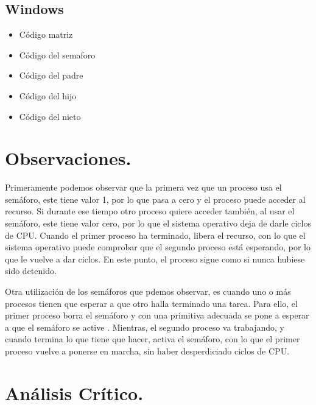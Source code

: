 \documentclass[12pt]{article}
\begin{document}
   \subsection{Windows}
    \begin{itemize}
       \item Código matriz
       
       \item Código del semaforo
       
       \item Código del padre
       
       \item Código del hijo
       
       \item Código del nieto
       
   \end{itemize}
   
  
   


\section{Observaciones.}

Primeramente podemos observar que la primera vez que un proceso usa el semáforo, este tiene valor 1, por lo que pasa a cero y el proceso puede acceder al recurso. Si durante ese tiempo otro proceso quiere acceder también, al usar el semáforo, este tiene valor cero, por lo que el sistema operativo deja de darle ciclos de CPU. Cuando el primer proceso ha terminado, libera el recurso, con lo que el sistema operativo puede comprobar que el segundo proceso está esperando, por lo que le vuelve a dar ciclos. En este punto, el proceso sigue como si nunca hubiese sido detenido. 

Otra utilización de los semáforos  que pdemos observar, es cuando uno o más procesos tienen que esperar a que otro halla terminado una tarea. Para ello, el primer proceso borra el semáforo y con una primitiva adecuada se pone a esperar a que el semáforo se active . Mientras, el segundo proceso va trabajando, y cuando termina lo que tiene que hacer, activa el semáforo, con lo que el primer proceso vuelve a ponerse en marcha, sin haber desperdiciado ciclos de CPU. 

\section{Análisis Crítico.}
\end{document}
